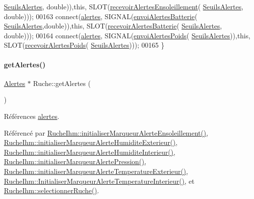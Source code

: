 \begin{DoxyCode}
      \hyperlink{parametres_8h_aaa6de8207c94675264c90b10b613368d}{SeuilsAlertes}, \textcolor{keywordtype}{double})),\textcolor{keyword}{this}, SLOT(\hyperlink{class_ruche_afdfb0cff676b6de5f421aed01c3d49db}{recevoirAlertesEnsoleillement}(
      \hyperlink{parametres_8h_aaa6de8207c94675264c90b10b613368d}{SeuilsAlertes}, \textcolor{keywordtype}{double})));
00163     connect(\hyperlink{class_ruche_af07644ddce44cb5ed4286475dc0f9d46}{alertes}, SIGNAL(\hyperlink{class_ruche_ac76ce5692e134b365330d91af2a6b4e7}{envoiAlertesBatterie}(
      \hyperlink{parametres_8h_aaa6de8207c94675264c90b10b613368d}{SeuilsAlertes},\textcolor{keywordtype}{double})),\textcolor{keyword}{this}, SLOT(\hyperlink{class_ruche_aee278a316c2e462e43705e15a36ab43f}{recevoirAlertesBatterie}(
      \hyperlink{parametres_8h_aaa6de8207c94675264c90b10b613368d}{SeuilsAlertes}, \textcolor{keywordtype}{double})));
00164     connect(\hyperlink{class_ruche_af07644ddce44cb5ed4286475dc0f9d46}{alertes}, SIGNAL(\hyperlink{class_ruche_a21d7f05b696896b1a3c7e20c396aaf23}{envoiAlertesPoids}(
      \hyperlink{parametres_8h_aaa6de8207c94675264c90b10b613368d}{SeuilsAlertes})),\textcolor{keyword}{this}, SLOT(\hyperlink{class_ruche_aa5dc6e5c65d0a685dcaa1c698b25e938}{recevoirAlertesPoids}(
      \hyperlink{parametres_8h_aaa6de8207c94675264c90b10b613368d}{SeuilsAlertes})));
00165 \}
\end{DoxyCode}
\mbox{\label{class_ruche_a9edbc2e81ccb2cb76de43639bcb16ec1}} 
\paragraph{\texorpdfstring{get\+Alertes()}{getAlertes()}}
{\footnotesize\ttfamily \hyperlink{class_alertes}{Alertes} $\ast$ Ruche\+::get\+Alertes (\begin{DoxyParamCaption}{ }\end{DoxyParamCaption})}



Références \hyperlink{class_ruche_af07644ddce44cb5ed4286475dc0f9d46}{alertes}.



Référencé par \hyperlink{class_ruche_ihm_a6d52dd904573d1bfc9551421ab53e8cc}{Ruche\+Ihm\+::initialiser\+Marqueur\+Alerte\+Ensoleillement()}, \hyperlink{class_ruche_ihm_ae572f3f2b76e8c9b14a699d3e29422ee}{Ruche\+Ihm\+::initialiser\+Marqueur\+Alerte\+Humidite\+Exterieur()}, \hyperlink{class_ruche_ihm_a42785d6da8aca09d8becb6d500de8d9f}{Ruche\+Ihm\+::initialiser\+Marqueur\+Alerte\+Humidite\+Interieur()}, \hyperlink{class_ruche_ihm_a87e4e8d783ea0f15d6304ed604c7ddaa}{Ruche\+Ihm\+::initialiser\+Marqueur\+Alerte\+Pression()}, \hyperlink{class_ruche_ihm_a410bcf0b7ac3ea7134af65d479802c48}{Ruche\+Ihm\+::initialiser\+Marqueur\+Alerte\+Temperature\+Exterieur()}, \hyperlink{class_ruche_ihm_a0f44cb030202047fa9a364dfcbf9a13f}{Ruche\+Ihm\+::\+Initialiser\+Marqueur\+Alerte\+Temperature\+Interieur()}, et \hyperlink{class_ruche_ihm_a7324ae6ea574ccdad47783f466933157}{Ruche\+Ihm\+::selectionner\+Ruche()}.


